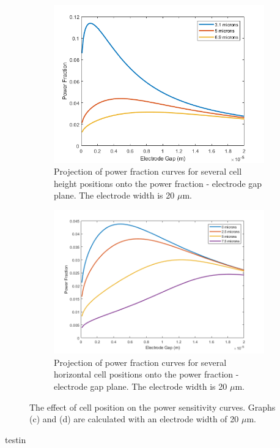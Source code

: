 \begin{figure}[h]
\begin{subfigure}[b]{0.49\textwidth}
    \end{subfigure}
    \\
    \vspace{0.1 in}
    \begin{subfigure}[b]{0.49\textwidth}
        \centering
        \includegraphics[width=\textwidth]{images/analytic_vertical_power_width20.png}
        \caption{Projection of power fraction curves for several cell height positions onto the power fraction - electrode gap plane. The electrode width is 20 $\mu$m.}
    \end{subfigure}
    \hfill
    \begin{subfigure}[b]{0.49\textwidth}
        \centering
        \includegraphics[width=\textwidth]{images/analytic_horizontal_power_20width.png}
        \caption{Projection of power fraction curves for several horizontal cell positions onto the power fraction - electrode gap plane. The electrode width is 20 $\mu$m.}
    \end{subfigure}
    \caption[power comp]{The effect of cell position on the power sensitivity curves. Graphs (c) and (d) are calculated with an electrode width of 20 $\mu$m.}
    \label{fig:analytic_sensitivity}
\end{figure}

testin